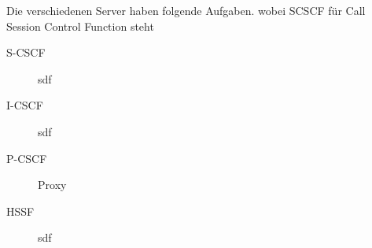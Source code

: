 \label{aufb}

Die verschiedenen Server haben folgende Aufgaben.
wobei SCSCF für Call Session Control Function steht

\begin{description}
\item[S-CSCF] sdf
\item[I-CSCF] sdf
\item[P-CSCF] Proxy
\item[HSSF] sdf
\end{description}